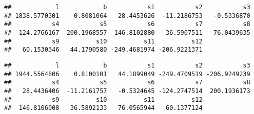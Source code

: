\documentclass[]{article}
\begin{document}
\begin{verbatim}
##            l            b           s1           s2           s3 
## 1838.5770301    0.8081064   28.4453626  -11.2186753   -0.5336870 
##           s4           s5           s6           s7           s8 
## -124.2766167  200.1968557  146.8102880   36.5907511   76.0439635 
##           s9          s10          s11          s12 
##   60.1530346   44.1790580 -249.4681974 -206.9221371
\end{verbatim}

\begin{verbatim}
##            l            b           s1           s2           s3 
## 1944.5564806    0.8100101   44.1899049 -249.4709519 -206.9249239 
##           s4           s5           s6           s7           s8 
##   28.4436406  -11.2161757   -0.5324645 -124.2747514  200.1936173 
##           s9          s10          s11          s12 
##  146.8106008   36.5892133   76.0565944   60.1377124
\end{verbatim}
\end{document}
